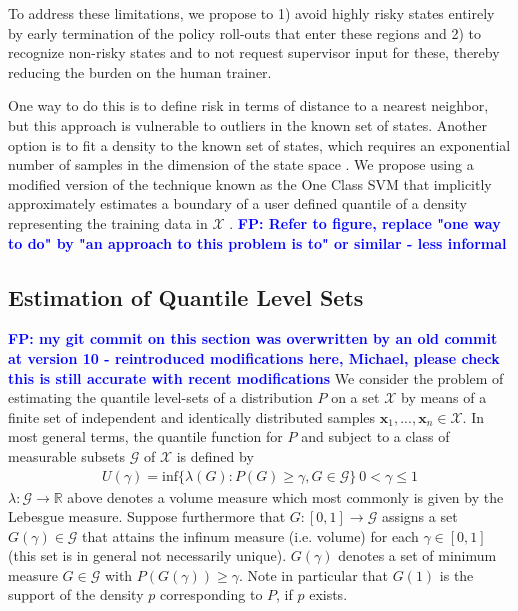 \documentclass[10pt, conference]{ieeeconf}      %
\newcommand{\fpnote}[1]{\ifthenelse{\boolean{include-notes}}%
 {\textcolor{blue}{\textbf{FP: #1}}}{}}
\begin{document}
To address these limitations, we propose to 1) avoid highly risky states entirely by early termination of the policy
roll-outs that enter these regions and 2) to recognize non-risky states and to not request supervisor input for these,
thereby reducing the burden on the human trainer. 

One way to do this is to define risk in terms of distance to a nearest neighbor, but this approach is vulnerable to
outliers in the known set of states. Another option is to fit a density to the known set of states, which requires an
exponential number of samples in the dimension of the state space \cite{nadaraya1964estimating}. We propose using a
modified version of the technique known as the One Class SVM that implicitly approximately estimates a boundary of a user defined quantile of
a density representing the training data in $\mathcal{X}$ \cite{scholkopf2001estimating}.
\fpnote{Refer to figure, replace "one way to do"  by "an approach to this problem is to" or similar - less informal}


\subsection{Estimation of Quantile Level Sets}\label{sec:level}
\fpnote{my git commit on this section was overwritten by an old commit at version 10 - reintroduced modifications here,
Michael, please check this is still accurate with recent modifications}
We consider the problem of estimating the quantile level-sets of a distribution $P$ on a set $\mathcal{X}$ by means of a finite set of
independent and identically distributed samples $\mathbf{x}_1,...,\mathbf{x}_n\in \mathcal{X}$.
In most general terms, the quantile function for $P$ and subject to a class of measurable subsets $\mathcal{G}$ of $\mathcal{X}$ is
defined by
\begin{align}\label{eq:quantile}
U(\gamma) = \mbox{inf} \lbrace \lambda(G):P(G) \geq \gamma, G \in \mathcal{G} \rbrace \: 0<\gamma \leq 1
\end{align} 
$\lambda:\mathcal{G}\to \mathbb{R}$ above denotes a volume measure which most commonly is given by the Lebesgue measure.
Suppose furthermore that $G:[0,1]\to \mathcal{G}$ assigns a set $G(\gamma) \in \mathcal{G}$ that attains the infinum
measure (i.e. volume) for each $\gamma\in [0,1]$ (this set is in general not necessarily unique). 
$G(\gamma)$ denotes a set of minimum measure $G \in \mathcal{G}$ with $P(G(\gamma))\ge \gamma$. Note in particular that $G(1)$ is the support of the density $p$ corresponding to $P$, if $p$ exists. 
\end{document}
